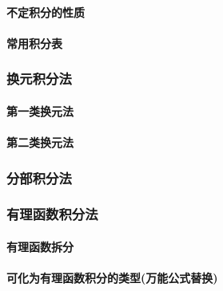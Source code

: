 \documentclass[
]{article}
\begin{document}
\hypertarget{ux4e0dux5b9aux79efux5206ux7684ux6027ux8d28}{%
\paragraph{不定积分的性质}\label{ux4e0dux5b9aux79efux5206ux7684ux6027ux8d28}}

\hypertarget{ux5e38ux7528ux79efux5206ux8868}{%
\paragraph{常用积分表}\label{ux5e38ux7528ux79efux5206ux8868}}

\hypertarget{ux6362ux5143ux79efux5206ux6cd5-1}{%
\subsubsection{换元积分法}\label{ux6362ux5143ux79efux5206ux6cd5-1}}

\hypertarget{ux7b2cux4e00ux7c7bux6362ux5143ux6cd5}{%
\paragraph{第一类换元法}\label{ux7b2cux4e00ux7c7bux6362ux5143ux6cd5}}

\hypertarget{ux7b2cux4e8cux7c7bux6362ux5143ux6cd5}{%
\paragraph{第二类换元法}\label{ux7b2cux4e8cux7c7bux6362ux5143ux6cd5}}

\hypertarget{ux5206ux90e8ux79efux5206ux6cd5-1}{%
\subsubsection{分部积分法}\label{ux5206ux90e8ux79efux5206ux6cd5-1}}

\hypertarget{ux6709ux7406ux51fdux6570ux79efux5206ux6cd5}{%
\subsubsection{有理函数积分法}\label{ux6709ux7406ux51fdux6570ux79efux5206ux6cd5}}

\hypertarget{ux6709ux7406ux51fdux6570ux62c6ux5206}{%
\paragraph{有理函数拆分}\label{ux6709ux7406ux51fdux6570ux62c6ux5206}}

\hypertarget{ux53efux5316ux4e3aux6709ux7406ux51fdux6570ux79efux5206ux7684ux7c7bux578bux4e07ux80fdux516cux5f0fux66ffux6362}{%
\paragraph{可化为有理函数积分的类型(万能公式替换)}\label{ux53efux5316ux4e3aux6709ux7406ux51fdux6570ux79efux5206ux7684ux7c7bux578bux4e07ux80fdux516cux5f0fux66ffux6362}}
\end{document}
